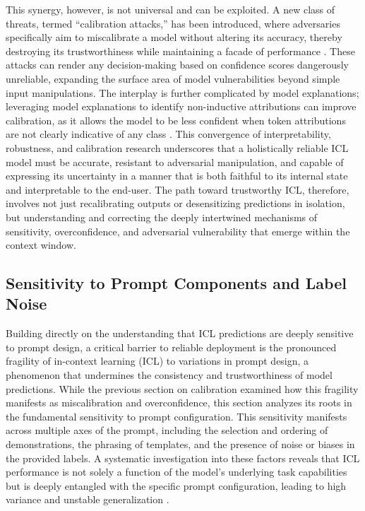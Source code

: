 \documentclass[11pt]{article}
\begin{document}
This synergy, however, is not universal and can be exploited. A new class of threats, termed ``calibration attacks,'' has been introduced, where adversaries specifically aim to miscalibrate a model without altering its accuracy, thereby destroying its trustworthiness while maintaining a facade of performance \cite{ref421}. These attacks can render any decision-making based on confidence scores dangerously unreliable, expanding the surface area of model vulnerabilities beyond simple input manipulations. The interplay is further complicated by model explanations; leveraging model explanations to identify non-inductive attributions can improve calibration, as it allows the model to be less confident when token attributions are not clearly indicative of any class \cite{ref422}. This convergence of interpretability, robustness, and calibration research underscores that a holistically reliable ICL model must be accurate, resistant to adversarial manipulation, and capable of expressing its uncertainty in a manner that is both faithful to its internal state and interpretable to the end-user. The path toward trustworthy ICL, therefore, involves not just recalibrating outputs or desensitizing predictions in isolation, but understanding and correcting the deeply intertwined mechanisms of sensitivity, overconfidence, and adversarial vulnerability that emerge within the context window.

\subsection{Sensitivity to Prompt Components and Label Noise}

Building directly on the understanding that ICL predictions are deeply sensitive to prompt design, a critical barrier to reliable deployment is the pronounced fragility of in-context learning (ICL) to variations in prompt design, a phenomenon that undermines the consistency and trustworthiness of model predictions. While the previous section on calibration examined how this fragility manifests as miscalibration and overconfidence, this section analyzes its roots in the fundamental sensitivity to prompt configuration. This sensitivity manifests across multiple axes of the prompt, including the selection and ordering of demonstrations, the phrasing of templates, and the presence of noise or biases in the provided labels. A systematic investigation into these factors reveals that ICL performance is not solely a function of the model's underlying task capabilities but is deeply entangled with the specific prompt configuration, leading to high variance and unstable generalization \cite{ref32}.
\end{document}
